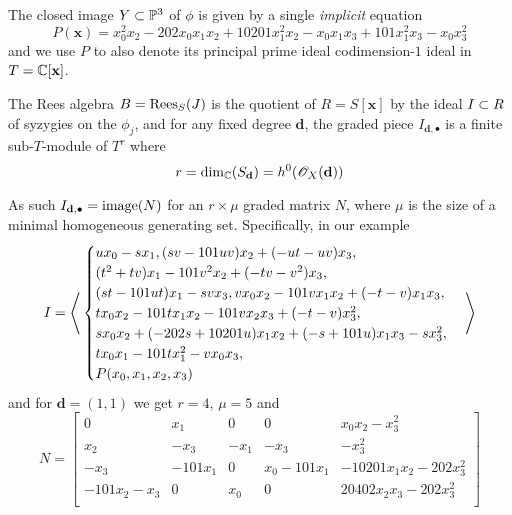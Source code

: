 \documentclass[fleqn,reqno]{amsart}
\begin{document}
\begin{example}[$\mt{ex203}$]
The closed image $Y\subset\mathbb{P}^3$ of $\phi$ is given by a single {\em implicit} equation
\[
	P(\mathbf x)={x}_{0}^{2} {x}_{2}-202 {x}_{0} {x}_{1} {x}_{2}+10201
  {x}_{1}^{2} {x}_{2}-{x}_{0} {x}_{1} {x}_{3}+101 {x}_{1}^{2} {x}_{3}-{x}_{0}
  {x}_{3}^{2}
\]
and we use $P$ to also denote its principal prime ideal codimension-$1$ ideal in $T=\mathbb{C}[\mathbf x]$.

The Rees algebra $B=\operatorname{Rees}_S(J)$ is the quotient of $R=S[\mathbf x]$ by the ideal $I\subset R$
of syzygies on the $\phi_j$,
and for any fixed degree $\mathbf d$,
the graded piece $I_{\mathbf d,\bullet}$ is a finite sub-$T$-module of $T^r$ where
\[
	r=\dim_{\mathbb{C}}(S_{\mathbf d})=h^0(\mathscr{O}_X(\mathbf d))
\]

As such $I_{\mathbf d,\bullet}=\operatorname{image}(N)$ for an $r\times\mu$ graded matrix $N$, where $\mu$
is the size of a minimal homogeneous generating set. Specifically, in our example
\[
	I=\Bigg\langle
	\begin{cases}
	u {x}_{0}-s {x}_{1},
	(s v-101 u v) {x}_{2}+(-u t-u v){x}_{3},\\
	(t^{2}+t v) {x}_{1}-101 v^{2} {x}_{2}+(-t v-v^{2}) {x}_{3},\\
	(s t-101 ut) {x}_{1}-s v {x}_{3},v {x}_{0} {x}_{2}-101 v {x}_{1} {x}_{2}+(-t-v) {x}_{1}{x}_{3},\\
  	t {x}_{0} {x}_{2}-101 t {x}_{1} {x}_{2}-101 v {x}_{2} {x}_{3}+(-t-v){x}_{3}^{2},\\
  	s {x}_{0} {x}_{2}+(-202 s+10201 u) {x}_{1} {x}_{2}+(-s+101 u){x}_{1} {x}_{3}-s {x}_{3}^{2},\\
	t {x}_{0} {x}_{1}-101 t {x}_{1}^{2}-v {x}_{0}{x}_{3},\\P(x_0,x_1,x_2,x_3)
	\end{cases}\Bigg\rangle
\]
and for $\mathbf d=(1,1)$ we get $r=4$, $\mu=5$ and 
\[
	N=\begin{bmatrix}0&
	       {x}_{1}&
	       0&
	       0&
	       {x}_{0} {x}_{2}-{x}_{3}^{2}\\
	       {x}_{2}&
	       {-{x}_{3}}&
	       {-{x}_{1}}&
	       {-{x}_{3}}&
	       {-{x}_{3}^{2}}\\
	       {-{x}_{3}}&
	       {-101 {x}_{1}}&
	       0&
	       {x}_{0}-101 {x}_{1}&
	       -10201 {x}_{1} {x}_{2}-202 {x}_{3}^{2}\\
	       -101 {x}_{2}-{x}_{3}&
	       0&
	       {x}_{0}&
	       0&
	       20402 {x}_{2} {x}_{3}-202 {x}_{3}^{2}\\
	       \end{bmatrix}
\]


\end{example}
\end{document}
